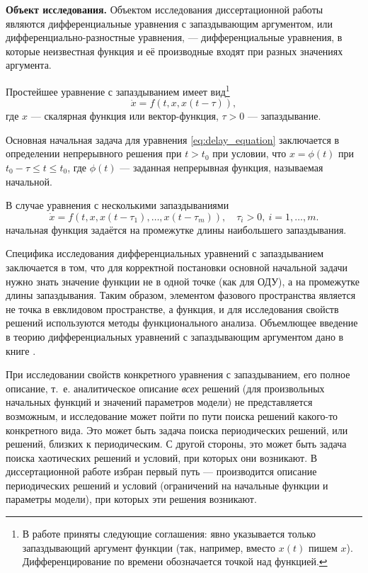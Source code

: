 \textbf{Объект исследования.} Объектом исследования диссертационной работы являются дифференциальные уравнения с запаздывающим аргументом, или дифференциально-разностные уравнения, --- дифференциальные уравнения, в которые неизвестная функция и её производные входят при разных значениях аргумента.

Простейшее уравнение с запаздыванием имеет вид\footnote{В работе приняты следующие соглашения: явно указывается только запаздывающий аргумент функции (так, например, вместо $x(t)$ пишем $x$). Дифференцирование по времени обозначается точкой над функцией.}
\begin{equation}
	\label{eq:delay_equation}
	\dot{x} = f(t, x, x(t - \tau)),
\end{equation}
где $x$ --- скалярная функция или вектор-функция, $\tau > 0$ --- запаздывание.

Основная начальная задача для уравнения \eqref{eq:delay_equation} заключается в определении непрерывного решения при $t > t_0$ при условии, что $x = \phi(t)$ при $t_0 - \tau \leq t \leq t_0$, где $\phi(t)$ --- заданная непрерывная функция, называемая начальной.

В случае уравнения с несколькими запаздываниями
\begin{equation}
	\label{eq:multiple_delay_equation}
	\dot{x} = f(t, x, x(t - \tau_1), \dots, x(t - \tau_m)), \quad \tau_i > 0, \ i = 1, \ldots, m.
\end{equation}
начальная функция задаётся на промежутке длины наибольшего запаздывания.

Специфика исследования дифференциальных уравнений с запаздыванием заключается в том, что для корректной постановки основной начальной задачи нужно знать значение функции не в одной точке (как для ОДУ), а на промежутке длины запаздывания. Таким образом, элементом фазового пространства является не точка в евклидовом пространстве, а функция, и для исследования свойств решений используются методы функционального анализа. Объемлющее введение в теорию дифференциальных уравнений с запаздывающим аргументом дано в книге \cite{Elsgoltz}.

При исследовании свойств конкретного уравнения с запаздыванием, его полное описание, т.~е. аналитическое описание \emph{всех} решений (для произвольных начальных функций и значений параметров модели) не представляется возможным, и исследование может пойти по пути поиска решений какого-то конкретного вида. Это может быть задача поиска периодических решений, или решений, близких к периодическим. С другой стороны, это может быть задача поиска хаотических решений и условий, при которых они возникают. В диссертационной работе избран первый путь --- производится описание периодических решений и условий (ограничений на начальные функции и параметры модели), при которых эти решения возникают.

